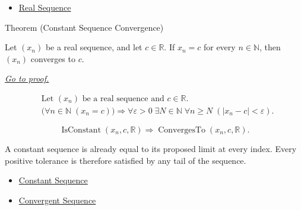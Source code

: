 \begin{dependencies}
\begin{itemize}
  \item \hyperref[def:real-sequence]{Real Sequence}
\end{itemize}
\end{dependencies}


\begin{theorembox}{Theorem (Constant Sequence Convergence)}
\begin{theorem}
\label{thm:constant-sequence-convergence}
Let $(x_n)$ be a real sequence, and let $c \in \mathbb{R}$. If $x_n = c$
for every $n \in \mathbb{N}$, then $(x_n)$ converges to $c$.

\smallskip
\noindent
\hyperref[prf:constant-sequence-convergence]{\textit{Go to proof.}}
\end{theorem}
\end{theorembox}

\begin{remark*}
\[
\begin{aligned}
&\text{Let } (x_n) \text{ be a real sequence and } c \in \mathbb{R}.\\
&\bigl(\forall n \in \mathbb{N}\;(x_n = c)\bigr)
\Longrightarrow
\forall \varepsilon > 0\;
\exists N \in \mathbb{N}\;
\forall n \ge N\;(|x_n - c| < \varepsilon).
\end{aligned}
\]
\end{remark*}

\begin{remark*}
\[
\operatorname{IsConstant}(x_n,c,\mathbb{R})
\Longrightarrow
\operatorname{ConvergesTo}(x_n,c,\mathbb{R}).
\]
\end{remark*}

\begin{remark*}[Interpretation]
A constant sequence is already equal to its proposed limit at every index.
Every positive tolerance is therefore satisfied by any tail of the sequence.
\end{remark*}

\begin{dependencies}
\begin{itemize}
  \item \hyperref[def:constant-sequence]{Constant Sequence}
  \item \hyperref[def:convergent-sequence]{Convergent Sequence}
\end{itemize}
\end{dependencies}

